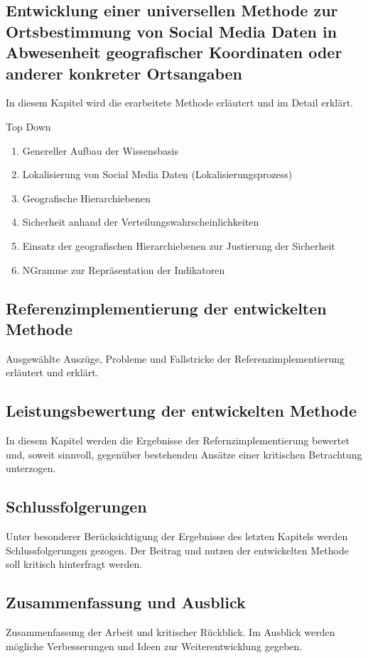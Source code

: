 \subsection{Entwicklung einer universellen Methode zur Ortsbestimmung von Social Media Daten in Abwesenheit geografischer Koordinaten oder anderer konkreter Ortsangaben}
In diesem Kapitel wird die erarbeitete Methode erläutert und im Detail erklärt. 

Top Down
\begin{enumerate}
	\item Genereller Aufbau der Wissensbasis
	\item Lokalisierung von Social Media Daten (Lokalisierungsprozess) 
	\item Geografische Hierarchiebenen
	\item Sicherheit anhand der Verteilungswahrscheinlichkeiten
	\item Einsatz der geografischen Hierarchiebenen zur Justierung der Sicherheit    
	\item NGramme zur Repräsentation der Indikatoren
\end{enumerate}

\subsection{Referenzimplementierung der entwickelten Methode}
Ausgewählte Auszüge, Probleme und Fallstricke der Referenzimplementierung erläutert und erklärt. 


\subsection{Leistungsbewertung der entwickelten Methode}
In diesem Kapitel werden die Ergebnisse der Refernzimplementierung bewertet und, soweit sinnvoll, gegenüber bestehenden Ansätze einer kritischen Betrachtung unterzogen. 


\subsection{Schlussfolgerungen}
Unter besonderer Berücksichtigung der Ergebnisse des letzten Kapitels werden Schlussfolgerungen gezogen. 
Der Beitrag und nutzen der entwickelten Methode soll kritisch hinterfragt werden.

\subsection{Zusammenfassung und Ausblick}
Zusammenfassung der Arbeit und kritischer Rückblick. Im Ausblick werden mögliche Verbesserungen und Ideen zur Weiterentwicklung gegeben.  